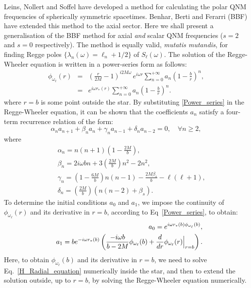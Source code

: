 \documentclass[aps,prd,longbibliography,reprint,twocolumn,amsmath,amssymb,amsfonts,showpacs,footnote,superscriptaddress]{revtex4-1}%
\begin{document}
Leins, Nollert and Soffel \cite{Leins:1993zz} have developed a method for calculating the polar QNM frequencies of spherically symmetric spacetimes. Benhar, Berti and Ferarri (BBF) have extended this method to the axial sector. Here we shall present a generalisation of the BBF method for axial \emph{and} scalar QNM frequencies ($s=2$ and $s=0$ respectively). The method is equally valid, \textit{mutatis mutandis}, for finding Regge poles $\{\lambda_n(\omega)= \ell_n +1/2\}$ of $ S_{\ell}(\omega)$.  The solution of the Regge-Wheeler equation is written in a power-series form as follows:
%
\begin{eqnarray}\label{Power_series}
 \phi_{\omega_\ell}(r)&=&\left(\frac{r}{2M}-1\right)^{i 2M\omega} \,e^{i\omega r} \sum_{n=0}^{+\infty}a_n\left(1-\frac{b}{r}\right)^n , \nonumber \\
                      &=& e^{i\omega r_*(r)}\sum_{n=0}^{+\infty}a_n\left(1-\frac{b}{r}\right)^n .
\end{eqnarray}
where $r = b$ is some point outside the star. By substituting \eqref{Power_series} in the Regge-Wheeler equation, it can be shown that the coefficients $a_n$ satisfy a four-term recurrence relation of the form:
\begin{equation}\label{Recurrence_4_terms}
\alpha_n a_{n+1} + \beta_n a_{n} +\gamma_{n} a_{n-1} +\delta_{n} a_{n-2}  = 0, \quad \forall n\geq 2 ,
\end{equation}
where
\begin{subequations}
\begin{eqnarray}\label{Coeffs_3_termes}
 && \alpha_n = n (n+1)\left(1-\frac{2M}{b}\right),    \\
 && \beta_n  = 2i\omega b n + 3\left(\frac{2M}{b}\right)n^2-2n^2 ,  \\
 && \gamma_n = \left(1-\frac{6M}{b}\right)n(n-1)-\frac{2M\beta_s}{b}-\ell(\ell+1) ,  \\
 && \delta_n = \left(\frac{2M}{b}\right)\left(n(n-2)+\beta_s\right) .
\end{eqnarray}
\end{subequations}
To determine the initial conditions $a_0$ and $a_1$, we impose the continuity of $\phi_{\omega_\ell}(r)$ and its derivative in $r = b$, according to Eq~\eqref{Power_series}, to obtain:
\begin{eqnarray}\label{Initial_Conds}
 && a_0 = e^{i\omega r_*(b)\phi_{\omega_\ell}(b)} ,  \\
 && a_1 = b e^{-i\omega r_*(b)}\left(\frac{-i\omega b}{b-2M}\phi_{\omega_\ell}(b)+ \frac{d}{dr}\phi_{\omega_\ell}(r)\Big{|}_{r=b}\right) .
\end{eqnarray}
Here, to obtain $\phi_{\omega_\ell}(b)$ and its derivative in $r=b$, we need to solve Eq.~\eqref{H_Radial_equation} numerically inside the star, and then to extend the solution outside, up to $r=b$, by solving the Regge-Wheeler equation numerically.
\end{document}
